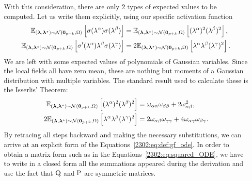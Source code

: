 With this consideration, there are only 2 types of expected values to be computed.
Let us write them explicitly, using our specific activation function
\[\begin{split}
  \Explf  \left[\act(\lf^\alpha)  \act(\lf^\beta)  \right] &= 
  \Explf  \left[(\lf^\alpha)^2 (\lf^\beta)^2 \right], \\
  \Explf  \left[\act'(\lf^\alpha) \lf^\beta \act(\lf^\gamma) \right] &= 
  2\Explf  \left[\lf^\alpha \lf^\beta (\lf^\gamma)^2\right]. \\
\end{split}
\]
We are left with some expected values of polynomials of Gaussian variables. Since the local fields all have zero mean, these are nothing but moments of a Gaussian distribution with multiple variables. The standard result used to calculate these is the Isserlis’ Theorem:
\begin{align*}
  \Explf  \left[(\lf^\alpha)^2 (\lf^\beta)^2 \right] 
  &= \omega_{\alpha\alpha}  \omega_{\beta\beta} + 2 \omega_{\alpha\beta}^2, \\
  2\Explf  \left[\lf^\alpha \lf^\beta (\lf^\gamma)^2\right] 
  &= 2 \omega_{\alpha\beta}\omega_{\gamma\gamma} + 4 \omega_{\alpha\gamma}\omega_{\beta\gamma}.\\
\end{align*}
By retracing all steps backward and making the necessary substitutions,
we can arrive at an explicit form of the Equations~\eqref{2302:eq:def:gf_ode}. In order
to obtain a matrix form such as in the Equations~\eqref{2302:eq:squared_ODE}, 
we have to write in a closed form all the summations appeared during the derivation
and use the fact that \(\Q\) and \(\P\) are symmetric matrices.
